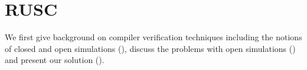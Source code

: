 \chapter{\;\;\;\;RUSC}
\label{sec:rusc}

We first give background on compiler verification techniques including the notions of closed and open simulations (), discuss the problems with open simulations () and present our solution ().









